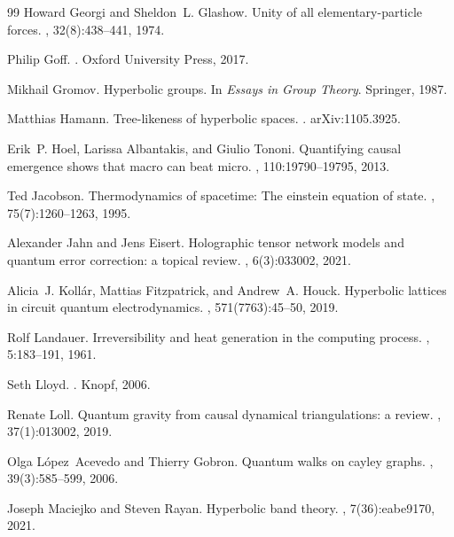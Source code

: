 \begin{thebibliography}{99}
Howard Georgi and Sheldon~L. Glashow.
\newblock Unity of all elementary-particle forces.
, 32(8):438--441, 1974.

Philip Goff.
.
\newblock Oxford University Press, 2017.

Mikhail Gromov.
\newblock Hyperbolic groups.
\newblock In {\em Essays in Group Theory}. Springer, 1987.

Matthias Hamann.
\newblock Tree-likeness of hyperbolic spaces.
.
\newblock arXiv:1105.3925.

Erik~P. Hoel, Larissa Albantakis, and Giulio Tononi.
\newblock Quantifying causal emergence shows that macro can beat micro.
,
  110:19790--19795, 2013.

Ted Jacobson.
\newblock Thermodynamics of spacetime: The einstein equation of state.
, 75(7):1260--1263, 1995.

Alexander Jahn and Jens Eisert.
\newblock Holographic tensor network models and quantum error correction: a
  topical review.
, 6(3):033002, 2021.

Alicia~J. Koll{\'a}r, Mattias Fitzpatrick, and Andrew~A. Houck.
\newblock Hyperbolic lattices in circuit quantum electrodynamics.
, 571(7763):45--50, 2019.

Rolf Landauer.
\newblock Irreversibility and heat generation in the computing process.
, 5:183--191, 1961.

Seth Lloyd.
.
\newblock Knopf, 2006.

Renate Loll.
\newblock Quantum gravity from causal dynamical triangulations: a review.
, 37(1):013002, 2019.

Olga L{\'o}pez~Acevedo and Thierry Gobron.
\newblock Quantum walks on cayley graphs.
, 39(3):585--599,
  2006.

Joseph Maciejko and Steven Rayan.
\newblock Hyperbolic band theory.
, 7(36):eabe9170, 2021.


\end{thebibliography}
